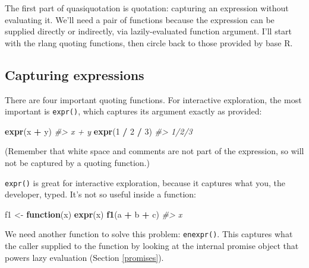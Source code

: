 \documentclass[]{book}
\makeatletter
\newenvironment{Shaded}{\begin{snugshade}}{\end{snugshade}}
\newcommand{\CommentTok}[1]{\textcolor[rgb]{0.37,0.37,0.37}{\textit{#1}}}
\newcommand{\ControlFlowTok}[1]{\textcolor[rgb]{0.27,0.27,0.27}{\textbf{#1}}}
\newcommand{\DecValTok}[1]{\textcolor[rgb]{0.06,0.06,0.06}{#1}}
\newcommand{\KeywordTok}[1]{\textcolor[rgb]{0.27,0.27,0.27}{\textbf{#1}}}
\newcommand{\NormalTok}[1]{#1}
\newcommand{\OperatorTok}[1]{\textcolor[rgb]{0.43,0.43,0.43}{\textbf{#1}}}
\newcommand{\StringTok}[1]{\textcolor[rgb]{0.5,0.5,0.5}{#1}}
\newcommand{\indexc}[1]{\index{#1@\texttt{#1}}}
\makeatother
\begin{document}

The first part of quasiquotation is quotation: capturing an expression without evaluating it. We'll need a pair of functions because the expression can be supplied directly or indirectly, via lazily-evaluated function argument. I'll start with the rlang quoting functions, then circle back to those provided by base R.

\hypertarget{capturing-expressions}{%
\subsection{Capturing expressions}\label{capturing-expressions}}

\indexc{expr()}

There are four important quoting functions. For interactive exploration, the most important is \texttt{expr()}, which captures its argument exactly as provided:

\begin{Shaded}
\begin{Highlighting}[]
\KeywordTok{expr}\NormalTok{(x }\OperatorTok{+}\StringTok{ }\NormalTok{y)}
\CommentTok{#> x + y}
\KeywordTok{expr}\NormalTok{(}\DecValTok{1} \OperatorTok{/}\StringTok{ }\DecValTok{2} \OperatorTok{/}\StringTok{ }\DecValTok{3}\NormalTok{)}
\CommentTok{#> 1/2/3}
\end{Highlighting}
\end{Shaded}

(Remember that white space and comments are not part of the expression, so will not be captured by a quoting function.)

\texttt{expr()} is great for interactive exploration, because it captures what you, the developer, typed. It's not so useful inside a function:

\begin{Shaded}
\begin{Highlighting}[]
\NormalTok{f1 <-}\StringTok{ }\ControlFlowTok{function}\NormalTok{(x) }\KeywordTok{expr}\NormalTok{(x)}
\KeywordTok{f1}\NormalTok{(a }\OperatorTok{+}\StringTok{ }\NormalTok{b }\OperatorTok{+}\StringTok{ }\NormalTok{c)}
\CommentTok{#> x}
\end{Highlighting}
\end{Shaded}

\indexc{enexpr()}

We need another function to solve this problem: \texttt{enexpr()}. This captures what the caller supplied to the function by looking at the internal promise object that powers lazy evaluation (Section \ref{promises}).
\end{document}
